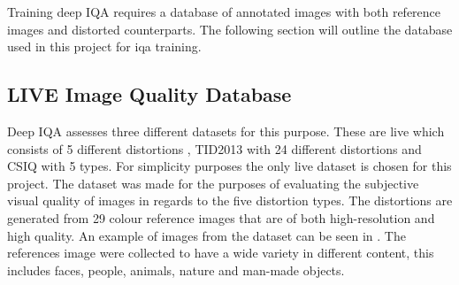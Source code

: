 Training deep IQA requires a database of annotated images with both reference images and distorted counterparts. The following section will outline the database used in this project for \gls{iqa} training.

\subsection{LIVE Image Quality Database}
Deep IQA assesses three different datasets for this purpose. These are \gls{live} which consists of 5 different distortions \cite{livepaper}, TID2013 \cite{tid2013} with 24 different distortions and CSIQ \cite{csiq} with 5 types. For simplicity purposes the only \gls{live} dataset is chosen for this project. The dataset was made for the purposes of evaluating the subjective visual quality of images in regards to the five distortion types. The distortions are generated from 29 colour reference images that are of both high-resolution and high quality. An example of images from the dataset can be seen in . The references image were collected to have a wide variety in different content, this includes faces, people, animals, nature and man-made objects.

